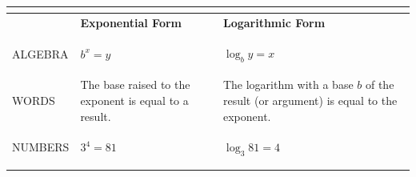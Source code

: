 \documentclass[border=6pt]{standalone}
\begin{document}
\begin{tabular}{@{} >{\bfseries\raggedright\arraybackslash}p{1.6cm} >{\centering\arraybackslash}p{5.2cm} >{\centering\arraybackslash}p{5.2cm} @{}}
\toprule
\multicolumn{3}{c}{\textbf{Logarithms}} \\
\midrule
 & \textbf{Exponential Form} & \textbf{Logarithmic Form} \\
\midrule
ALGEBRA & $b^{x}=y$ & $\log_b y=x$ \\[6pt]
WORDS & The base raised to the exponent is equal to a result. & The logarithm with a base $b$ of the result (or argument) is equal to the exponent. \\[6pt]
NUMBERS & $3^{4}=81$ & $\log_3 81=4$ \\
\bottomrule
\end{tabular}
\end{document}
